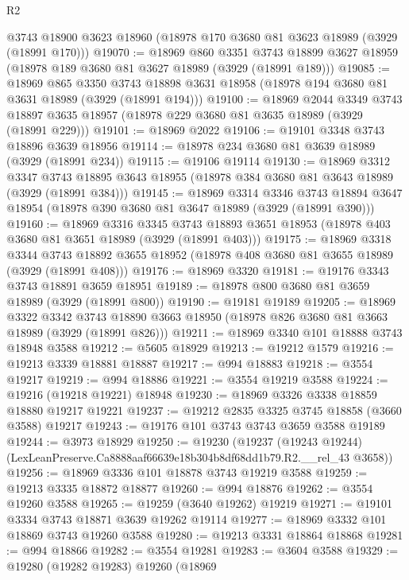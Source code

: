 \begin{lexlean}{R2}
\begin{coremodule}
    @3743
    @18900
    @3623
    @18960
    (@18978 @170 @3680 @81 @3623 @18989 (@3929 (@18991 @170)))
@19070 := @18969
    @860
    @3351
    @3743
    @18899
    @3627
    @18959
    (@18978 @189 @3680 @81 @3627 @18989 (@3929 (@18991 @189)))
@19085 := @18969
    @865
    @3350
    @3743
    @18898
    @3631
    @18958
    (@18978 @194 @3680 @81 @3631 @18989 (@3929 (@18991 @194)))
@19100 := @18969
    @2044
    @3349
    @3743
    @18897
    @3635
    @18957
    (@18978 @229 @3680 @81 @3635 @18989 (@3929 (@18991 @229)))
@19101 := @18969 @2022
@19106 := @19101 @3348 @3743 @18896 @3639 @18956
@19114 := @18978 @234 @3680 @81 @3639 @18989 (@3929 (@18991 @234))
@19115 := @19106 @19114
@19130 := @18969
    @3312
    @3347
    @3743
    @18895
    @3643
    @18955
    (@18978 @384 @3680 @81 @3643 @18989 (@3929 (@18991 @384)))
@19145 := @18969
    @3314
    @3346
    @3743
    @18894
    @3647
    @18954
    (@18978 @390 @3680 @81 @3647 @18989 (@3929 (@18991 @390)))
@19160 := @18969
    @3316
    @3345
    @3743
    @18893
    @3651
    @18953
    (@18978 @403 @3680 @81 @3651 @18989 (@3929 (@18991 @403)))
@19175 := @18969
    @3318
    @3344
    @3743
    @18892
    @3655
    @18952
    (@18978 @408 @3680 @81 @3655 @18989 (@3929 (@18991 @408)))
@19176 := @18969 @3320
@19181 := @19176 @3343 @3743 @18891 @3659 @18951
@19189 := @18978 @800 @3680 @81 @3659 @18989 (@3929 (@18991 @800))
@19190 := @19181 @19189
@19205 := @18969
    @3322
    @3342
    @3743
    @18890
    @3663
    @18950
    (@18978 @826 @3680 @81 @3663 @18989 (@3929 (@18991 @826)))
@19211 := @18969 @3340 @101 @18888 @3743 @18948 @3588
@19212 := @5605 @18929
@19213 := @19212 @1579
@19216 := @19213 @3339 @18881 @18887
@19217 := @994 @18883
@19218 := @3554 @19217
@19219 := @994 @18886
@19221 := @3554 @19219 @3588
@19224 := @19216 (@19218 @19221) @18948
@19230 := @18969 @3326 @3338 @18859 @18880 @19217 @19221
@19237 := @19212 @2835 @3325 @3745 @18858 (@3660 @3588) @19217
@19243 := @19176 @101 @3743 @3743 @3659 @3588 @19189
@19244 := @3973 @18929
@19250 := @19230
    (@19237 (@19243 @19244) (LexLeanPreserve.Ca8888aaf66639e18b304b8df68dd1b79.R2.__rel_43 @3658))
@19256 := @18969 @3336 @101 @18878 @3743 @19219 @3588
@19259 := @19213 @3335 @18872 @18877
@19260 := @994 @18876
@19262 := @3554 @19260 @3588
@19265 := @19259 (@3640 @19262) @19219
@19271 := @19101 @3334 @3743 @18871 @3639 @19262 @19114
@19277 := @18969 @3332 @101 @18869 @3743 @19260 @3588
@19280 := @19213 @3331 @18864 @18868
@19281 := @994 @18866
@19282 := @3554 @19281
@19283 := @3604 @3588
@19329 := @19280
    (@19282 @19283)
    @19260
    (@18969

\end{coremodule}
\end{lexlean}

